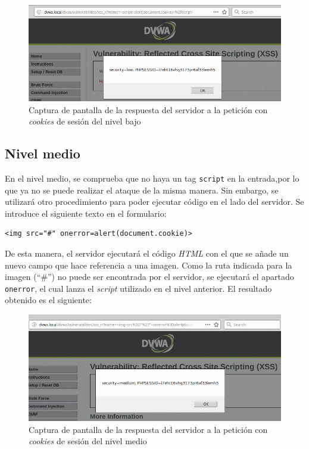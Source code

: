 \documentclass{article}
\begin{document}
\begin{figure}[h!]
    \centering
    \includegraphics[scale=0.6]{images/xss_reflected_low.png}
    \caption{Captura de pantalla de la respuesta del servidor a la petición con \textit{cookies} de sesión del nivel bajo}
    \label{fig:xss_reflected_low}
\end{figure}

\subsection{Nivel medio}\label{medium-xss-reflected}
En el nivel medio, se comprueba que no haya un tag \texttt{script} en la entrada,por lo que ya no se puede realizar el ataque de la misma manera. Sin embargo, se utilizará otro procedimiento para poder ejecutar código en el lado del servidor. Se introduce el siguiente texto en el formulario:

\begin{lstlisting}
<img src="#" onerror=alert(document.cookie)>
\end{lstlisting}

De esta manera, el servidor ejecutará el código \textit{HTML} con el que se añade un nuevo campo que hace referencia a una imagen. Como la ruta indicada para la imagen (``\#'') no puede ser encontrada por el servidor, se ejecutará el apartado \texttt{onerror}, el cual lanza el \textit{script} utilizado en el nivel anterior. El resultado obtenido es el siguiente:

\begin{figure}[h!]
    \centering
    \includegraphics[scale=0.6]{images/xss_reflected_medium.png}
    \caption{Captura de pantalla de la respuesta del servidor a la petición con \textit{cookies} de sesión del nivel medio}
    \label{fig:xss_reflected_medium}
\end{figure}
\end{document}
